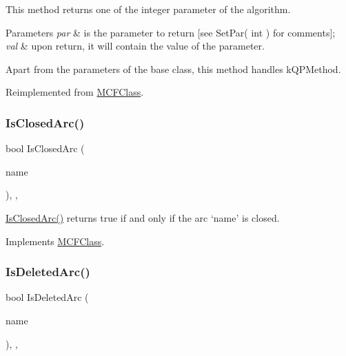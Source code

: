 This method returns one of the integer parameter of the algorithm.


\begin{DoxyParams}{Parameters}
{\em par} & is the parameter to return \mbox{[}see Set\+Par( int ) for comments\mbox{]};\\
\hline
{\em val} & upon return, it will contain the value of the parameter.\\
\hline
\end{DoxyParams}
Apart from the parameters of the base class, this method handles k\+Q\+P\+Method. 

Reimplemented from \mbox{\hyperlink{class_m_c_f_class_ac66ea95b63fe61ce67e0f8544f200887}{M\+C\+F\+Class}}.

\mbox{\label{class_m_c_f_cplex_a95d97fdf20e0075a8deda52f4925072a}} 
\subsubsection{\texorpdfstring{Is\+Closed\+Arc()}{IsClosedArc()}}
{\footnotesize\ttfamily bool Is\+Closed\+Arc (\begin{DoxyParamCaption}\item[{\mbox{\hyperlink{class_m_c_f_class_a76aaabb20535c51a2752b93f6c38fe54}{c\+Index}}}]{name }\end{DoxyParamCaption})\hspace{0.3cm}{\ttfamily [inline]}, {\ttfamily [override]}, {\ttfamily [virtual]}}

\mbox{\hyperlink{class_m_c_f_cplex_a95d97fdf20e0075a8deda52f4925072a}{Is\+Closed\+Arc()}} returns true if and only if the arc `name' is closed. 

Implements \mbox{\hyperlink{class_m_c_f_class_a2db08ae33bcdb997677a69f36c60c1e5}{M\+C\+F\+Class}}.

\mbox{\label{class_m_c_f_cplex_a303cdd3554fa6aa53098d080262d1e4b}} 
\subsubsection{\texorpdfstring{Is\+Deleted\+Arc()}{IsDeletedArc()}}
{\footnotesize\ttfamily bool Is\+Deleted\+Arc (\begin{DoxyParamCaption}\item[{\mbox{\hyperlink{class_m_c_f_class_a76aaabb20535c51a2752b93f6c38fe54}{c\+Index}}}]{name }\end{DoxyParamCaption})\hspace{0.3cm}{\ttfamily [inline]}, {\ttfamily [override]}, {\ttfamily [virtual]}}

